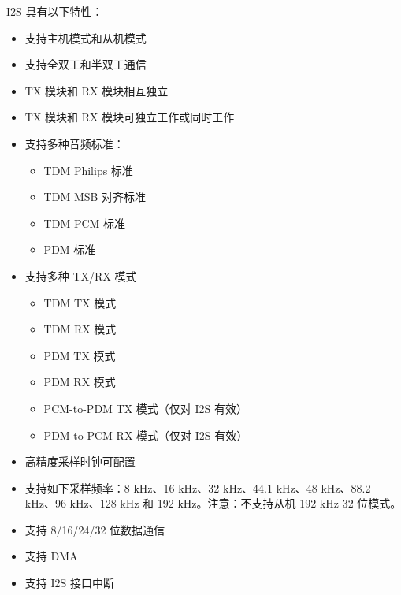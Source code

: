 \documentclass[main\_\_CN.tex]{subfiles}
\begin{document}
I2S 具有以下特性：
\begin{itemize}
    \item 支持主机模式和从机模式
    \item 支持全双工和半双工通信
    \item TX 模块和 RX 模块相互独立
    \item TX 模块和 RX 模块可独立工作或同时工作
    \item 支持多种音频标准：
    \begin{itemize}
        \item TDM Philips 标准
        \item TDM MSB 对齐标准
        \item TDM PCM 标准
        \item PDM 标准
    \end{itemize}
    \item 支持多种 TX/RX 模式
        \begin{itemize}
        \item TDM TX 模式
        \item TDM RX 模式
        \item PDM TX 模式
        \item PDM RX 模式
        \item PCM-to-PDM TX 模式（仅对 I2S 有效）
        \item PDM-to-PCM RX 模式（仅对 I2S 有效）
    \end{itemize}
    \item 高精度采样时钟可配置
    \item 支持如下采样频率：8 kHz、16 kHz、32 kHz、44.1 kHz、48 kHz、88.2 kHz、96 kHz、128 kHz 和 192 kHz。注意：不支持从机 192 kHz 32 位模式。
    \item 支持 8/16/24/32 位数据通信
    \item 支持 DMA
    \item 支持 I2S 接口中断
\end{itemize}
\end{document}
